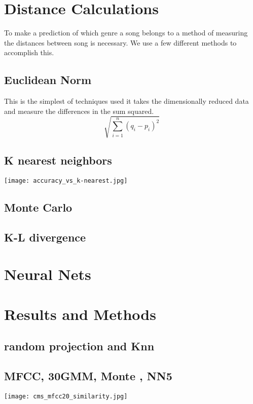 \documentclass[12pt]{article}
\begin{document}
\section{Distance Calculations}
To make a prediction of which genre a song belongs to a method of measuring the distances between song is necessary. We use a few different methods to accomplish this. 
\subsection{Euclidean Norm}
This is the simplest of techniques used it takes the dimensionally reduced data and measure the differences in the sum squared.
\[\sqrt{\sum_{i=1}^{n} (q_{i}-p_{i})^{2}} \]
\subsection{K nearest neighbors}
\texttt{[image: accuracy\_vs\_k-nearest.jpg]}
\subsection{Monte Carlo}
\subsection{K-L divergence}

\section{Neural Nets}

\section{Results and Methods}
\subsection{random projection and Knn}
\subsection{MFCC, 30GMM, Monte , NN5}
	
\texttt{[image: cms\_mfcc20\_similarity.jpg]}

\newpage
\end{document}
